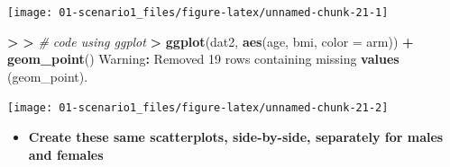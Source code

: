 \documentclass[
]{book}
\newenvironment{Shaded}{\begin{snugshade}}{\end{snugshade}}
\newcommand{\CommentTok}[1]{\textcolor[rgb]{0.56,0.35,0.01}{\textit{#1}}}
\newcommand{\DataTypeTok}[1]{\textcolor[rgb]{0.13,0.29,0.53}{#1}}
\newcommand{\DecValTok}[1]{\textcolor[rgb]{0.00,0.00,0.81}{#1}}
\newcommand{\ErrorTok}[1]{\textcolor[rgb]{0.64,0.00,0.00}{\textbf{#1}}}
\newcommand{\KeywordTok}[1]{\textcolor[rgb]{0.13,0.29,0.53}{\textbf{#1}}}
\newcommand{\NormalTok}[1]{#1}
\newcommand{\OperatorTok}[1]{\textcolor[rgb]{0.81,0.36,0.00}{\textbf{#1}}}
\newcommand{\StringTok}[1]{\textcolor[rgb]{0.31,0.60,0.02}{#1}}
\providecommand{\tightlist}{%
  \setlength{\itemsep}{0pt}\setlength{\parskip}{0pt}}
\begin{document}
\begin{center}\texttt{[image: 01-scenario1\_files/figure-latex/unnamed-chunk-21-1]} \end{center}

\begin{Shaded}
\begin{Highlighting}[]
\OperatorTok{>}\StringTok{ }
\ErrorTok{>}\StringTok{ }\CommentTok{# code using ggplot}
\ErrorTok{>}\StringTok{ }\KeywordTok{ggplot}\NormalTok{(dat2, }\KeywordTok{aes}\NormalTok{(age, bmi, }\DataTypeTok{color =}\NormalTok{ arm)) }\OperatorTok{+}\StringTok{ }\KeywordTok{geom_point}\NormalTok{()}
\NormalTok{Warning}\OperatorTok{:}\StringTok{ }\NormalTok{Removed }\DecValTok{19}\NormalTok{ rows containing missing }\KeywordTok{values}\NormalTok{ (geom_point).}
\end{Highlighting}
\end{Shaded}

\begin{center}\texttt{[image: 01-scenario1\_files/figure-latex/unnamed-chunk-21-2]} \end{center}

\begin{itemize}
\tightlist
\item
  \textbf{Create these same scatterplots, side-by-side, separately for males and females}
\end{itemize}

\begin{Shaded}
\end{Shaded}
\end{document}
